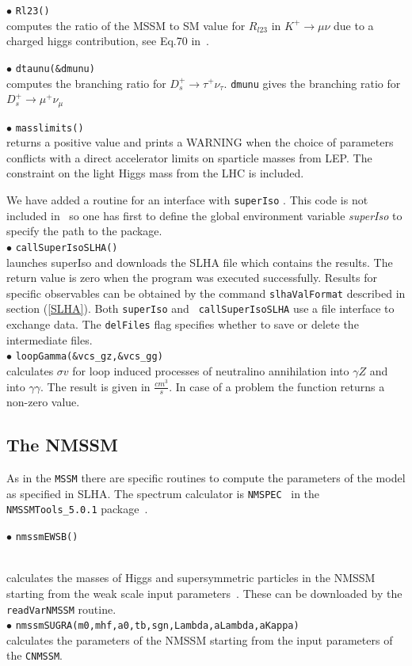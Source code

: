 \documentclass[12pt,a4paper]{article}
\begin{document}
{\noi$\bullet$ \verb|Rl23()|\\
computes the ratio of the MSSM to SM value for $R_{l23}$ in $K^+\rightarrow \mu\nu$  due to a  charged higgs contribution, see Eq.70 in~\cite{Belanger:2013oya}. 

\noi$\bullet$ \verb|dtaunu(&dmunu)|\\
computes the branching ratio  for ${D}_s^+\rightarrow\tau^+\nu_\tau$. \verb|dmunu| 
gives  the branching ratio  for ${D}_s^+\rightarrow\mu^+\nu_\mu$

 
\noi$\bullet$ \verb|masslimits()|\\
returns a positive value  and
 prints a WARNING when the choice of parameters conflicts with a
direct accelerator limits on sparticle masses from LEP.
The constraint on the light Higgs mass from the LHC is included.  

We have added a routine for an interface with {\tt superIso}
\cite{Arbey:2011zz}. This code is not 
included in \micro\ so one has first to define 
the global environment  variable {\it superIso} 
to specify the path to the package.\\ 
\noi$\bullet$ \verb|callSuperIsoSLHA()|\\
launches superIso and downloads the SLHA file which  contains the results. The
return value is zero when the program was  executed successfully.  Results
for specific  observables can be obtained by the command {\tt slhaValFormat}
described in  section (\ref{SLHA}).  Both {\tt superIso} and {\tt
callSuperIsoSLHA} use a file interface to exchange data. The {\tt delFiles} flag specifies whether
to save or delete the intermediate files.\\
\noi$\bullet$ \verb|loopGamma(&vcs_gz,&vcs_gg)|\\
calculates $\sigma v$ for  loop induced processes of neutralino
annihilation into $\gamma Z$ and into $\gamma \gamma$. The result is given in  
$\frac{cm^3}{s}$. In case of a problem the function returns a non-zero value. 

\subsection{The NMSSM}

As in the {\tt MSSM} there are specific routines to compute the  
parameters of the model as  specified in SLHA. The spectrum calculator is \verb|NMSPEC|~\cite{Ellwanger:2006rn}
 in the \verb|NMSSMTools_5.0.1| package~\cite{nmssmtools}.

\noindent$\bullet$ \verb|nmssmEWSB()|}\\
calculates the masses of Higgs and supersymmetric particles in the NMSSM
starting from the weak scale input parameters~\cite{Ellwanger:2005dv}. These  can be downloaded by the 
{\tt readVarNMSSM} routine.\\   
\noindent$\bullet$ \verb|nmssmSUGRA(m0,mhf,a0,tb,sgn,Lambda,aLambda,aKappa)|\\
calculates the parameters of the NMSSM starting from the input parameters of 
the \verb|CNMSSM|.
\end{document}
